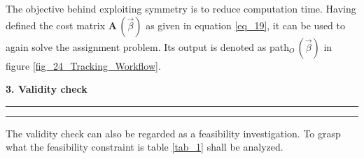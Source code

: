 The objective behind exploiting symmetry is to reduce computation time. 
Having defined the cost matrix $\bm A\,(\vec{\beta})$ as given in equation \eqref{eq_19}, it can be used to again solve the assignment problem.
Its output is denoted as path$_O\,(\vec{\beta })$ in figure \ref{fig_24_Tracking_Workflow}.\newline

\textbf{3. Validity check}
\hrule
\vspace{0.05cm}
\hrule
\vspace{0.25cm}
The validity check can also be regarded as a feasibility investigation.
To grasp what the feasibility constraint is table \ref{tab_1} shall be analyzed.\newline 

